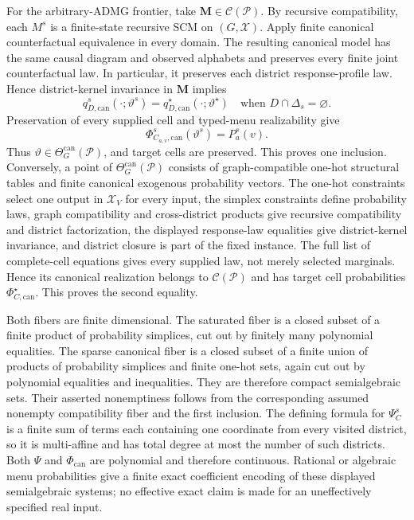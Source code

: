 For the arbitrary-ADMG frontier, take \(\mathbf M\in\mathcal C(\mathcal P)\).  By recursive compatibility, each \(M^s\) is a finite-state recursive SCM on \((G,\mathcal X)\).  Apply finite canonical counterfactual equivalence in every domain.  The resulting canonical model has the same causal diagram and observed alphabets and preserves every finite joint counterfactual law.  In particular, it preserves each district response-profile law.  Hence district-kernel invariance in \(\mathbf M\) implies
\[
q_{D,\mathrm{can}}^s(\cdot;\vartheta^s)
=q_{D,\mathrm{can}}^\star(\cdot;\vartheta^\star)
\quad\text{when }D\cap\Delta_s=\varnothing.
\]
Preservation of every supplied cell and typed-menu realizability give
\[
\Phi_{C_{a,v},\mathrm{can}}^s(\vartheta^s)=P_a^s(v).
\]
Thus \(\vartheta\in\Theta_G^{\mathrm{can}}(\mathcal P)\), and target cells are preserved.  This proves one inclusion.  Conversely, a point of \(\Theta_G^{\mathrm{can}}(\mathcal P)\) consists of graph-compatible one-hot structural tables and finite canonical exogenous probability vectors.  The one-hot constraints select one output in \(\mathcal X_V\) for every input, the simplex constraints define probability laws, graph compatibility and cross-district products give recursive compatibility and district factorization, the displayed response-law equalities give district-kernel invariance, and district closure is part of the fixed instance.  The full list of complete-cell equations gives every supplied law, not merely selected marginals.  Hence its canonical realization belongs to \(\mathcal C(\mathcal P)\) and has target cell probabilities \(\Phi_{C,\mathrm{can}}^\star\).  This proves the second equality.

Both fibers are finite dimensional.  The saturated fiber is a closed subset of a finite product of probability simplices, cut out by finitely many polynomial equalities.  The sparse canonical fiber is a closed subset of a finite union of products of probability simplices and finite one-hot sets, again cut out by polynomial equalities and inequalities.  They are therefore compact semialgebraic sets.  Their asserted nonemptiness follows from the corresponding assumed nonempty compatibility fiber and the first inclusion.  The defining formula for \(\Psi_C^s\) is a finite sum of terms each containing one coordinate from every visited district, so it is multi-affine and has total degree at most the number of such districts.  Both \(\Psi\) and \(\Phi_{\mathrm{can}}\) are polynomial and therefore continuous.  Rational or algebraic menu probabilities give a finite exact coefficient encoding of these displayed semialgebraic systems; no effective exact claim is made for an uneffectively specified real input.

